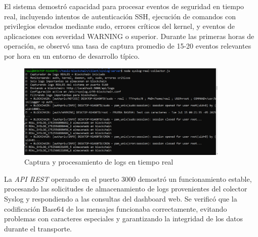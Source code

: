 El sistema demostró capacidad para procesar eventos de seguridad en tiempo real, incluyendo intentos de autenticación SSH, ejecución de comandos con privilegios elevados mediante sudo, errores críticos del kernel, y eventos de aplicaciones con severidad WARNING o superior. Durante las primeras horas de operación, se observó una tasa de captura promedio de 15-20 eventos relevantes por hora en un entorno de desarrollo típico.
\begin{figure}[H]
\centering
\includegraphics[width=0.90\textwidth]{figuras/captura_logs_tiempo_real.png}
\caption{Captura y procesamiento de logs en tiempo real}
\label{fig:captura-tiempo-real}
\end{figure}
La \textit{API REST} operando en el puerto 3000 demostró un funcionamiento estable, procesando las solicitudes de almacenamiento de logs provenientes del colector Syslog y respondiendo a las consultas del dashboard web. Se verificó que la codificación Base64 de los mensajes funcionaba correctamente, evitando problemas con caracteres especiales y garantizando la integridad de los datos durante el transporte.


